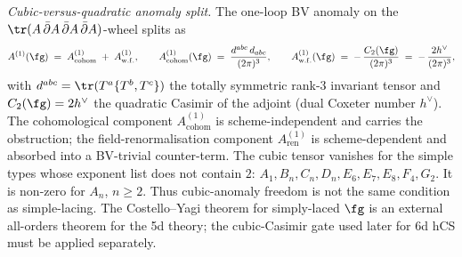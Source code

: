\begin{proposition}
\emph{Cubic-versus-quadratic anomaly split.} The one-loop BV anomaly
on the $\tr(A\,\bar\partial A\,\bar\partial A\,\bar\partial A)$-wheel
splits as
\begin{equation}
\label{eq:5d-hCS-anomaly-split}
 A^{(1)}(\fg) \;=\; A^{(1)}_{\mathrm{cohom}} \;+\; A^{(1)}_{\mathrm{w.f.}},
 \qquad
 A^{(1)}_{\mathrm{cohom}}(\fg) \;=\; \frac{d^{abc}\, d_{abc}}{(2\pi)^3},
 \qquad
 A^{(1)}_{\mathrm{w.f.}}(\fg) \;=\; -\,\frac{C_2(\fg)}{(2\pi)^3}
 \;=\; -\,\frac{2 h^\vee}{(2\pi)^3},
\end{equation}
with $d^{abc} = \tr(T^a \{T^b, T^c\})$ the totally symmetric rank-$3$
invariant tensor and $C_2(\fg) = 2 h^\vee$ the quadratic Casimir of
the adjoint (dual Coxeter number $h^\vee$). The cohomological
component $A^{(1)}_{\mathrm{cohom}}$ is scheme-independent and carries
the obstruction; the field-renormalisation component $A^{(1)}_{\mathrm{ren}}$
is scheme-dependent and absorbed into a BV-trivial counter-term. The
cubic tensor vanishes for the simple types whose exponent list does
not contain $2$: $A_1, B_n, C_n, D_n, E_6, E_7, E_8, F_4, G_2$.
It is non-zero for $A_n$, $n \geq 2$. Thus cubic-anomaly freedom is
not the same condition as simple-lacing. The Costello--Yagi theorem
for simply-laced $\fg$ is an external all-orders theorem for the
5d theory; the cubic-Casimir gate used later for 6d hCS must be
applied separately.
\end{proposition}

